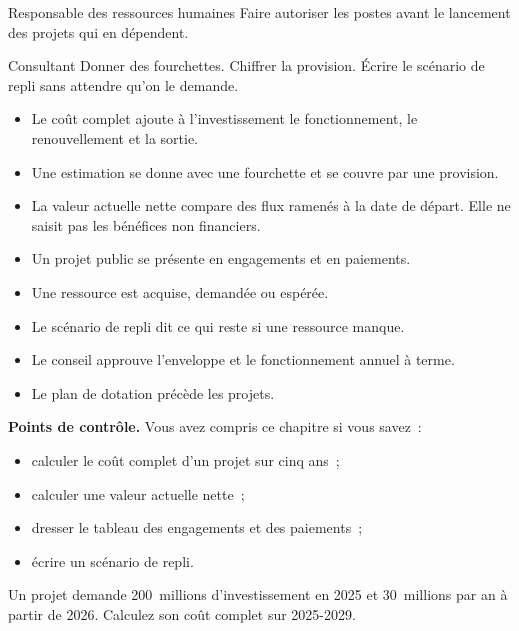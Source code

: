 \begin{boxmetier}{Responsable des ressources humaines}
Faire autoriser les postes avant le lancement des projets qui en dépendent.
\end{boxmetier}

\begin{boxmetier}{Consultant}
Donner des fourchettes. Chiffrer la provision. Écrire le scénario de repli sans attendre qu'on le demande.
\end{boxmetier}

\begin{boxresume}
\begin{itemize}
    \item Le coût complet ajoute à l'investissement le fonctionnement, le renouvellement et la sortie.
    \item Une estimation se donne avec une fourchette et se couvre par une provision.
    \item La valeur actuelle nette compare des flux ramenés à la date de départ. Elle ne saisit pas les bénéfices non financiers.
    \item Un projet public se présente en engagements et en paiements.
    \item Une ressource est acquise, demandée ou espérée.
    \item Le scénario de repli dit ce qui reste si une ressource manque.
    \item Le conseil approuve l'enveloppe et le fonctionnement annuel à terme.
    \item Le plan de dotation précède les projets.
\end{itemize}
\end{boxresume}

\begin{boxinfo}
\textbf{Points de contrôle.} Vous avez compris ce chapitre si vous savez~:
\begin{itemize}
    \item calculer le coût complet d'un projet sur cinq ans~;
    \item calculer une valeur actuelle nette~;
    \item dresser le tableau des engagements et des paiements~;
    \item écrire un scénario de repli.
\end{itemize}
\end{boxinfo}

\begin{boxexo}[title={\ding{45}\quad Exercice~12.1. Coût complet \niveaubase}]
Un projet demande 200~millions d'investissement en 2025 et 30~millions par an à partir de 2026. Calculez son coût complet sur 2025-2029.
\end{boxexo}

